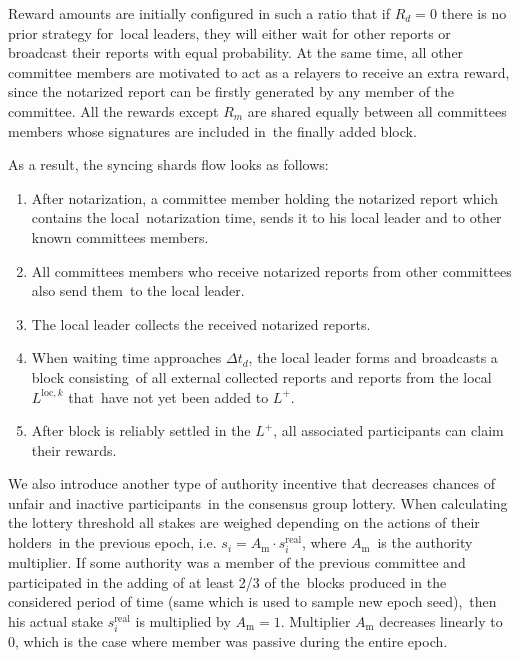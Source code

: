 Reward amounts are initially configured in such a ratio that if ${R_d=0}$ there is no prior strategy for\
local leaders, they will either wait for other reports or broadcast their reports with equal probability.
At the same time, all other committee members are motivated to act as a relayers to receive an extra reward,
since the notarized report can be firstly generated by any member of the committee.
All the rewards except $R_m$ are shared equally between all committees members whose signatures are included in\
the finally added block.

As a result, the syncing shards flow looks as follows:
\begin{enumerate}
    \item After notarization, a committee member holding the notarized report which contains the local\
    notarization time, sends it to his local leader and to other known committees members.
    \item All committees members who receive notarized reports from other committees also send them\
    to the local leader.
    \item The local leader collects the received notarized reports.
    \item When waiting time approaches $\Delta t_d$, the local leader forms and broadcasts a block consisting\
    of all external collected reports and reports from the local $L^{\text{loc}, k}$ that\
    have not yet been added to $L^+$.
    \item After block is reliably settled in the $L^+$, all associated participants can claim their rewards.
\end{enumerate}

We also introduce another type of authority incentive that decreases chances of unfair and inactive participants\
in the consensus group lottery.
When calculating the lottery threshold all stakes are weighed depending on the actions of their holders\
in the previous epoch, i.e. ${s_i = A_{\text{m}} \cdot s_i^{\text{real}}}$, where $A_{\text{m}}$\
is the authority multiplier.
If some authority was a member of the previous committee and participated in the adding of at least 2/3 of the\
blocks produced in the considered period of time (same which is used to sample new epoch seed),\
then his actual stake ${s_i^{\text{real}}}$ is multiplied by ${A_{\text{m}} = 1}$.
Multiplier $A_{\text{m}}$ decreases linearly to 0, which is the case where member was passive during the entire epoch.

